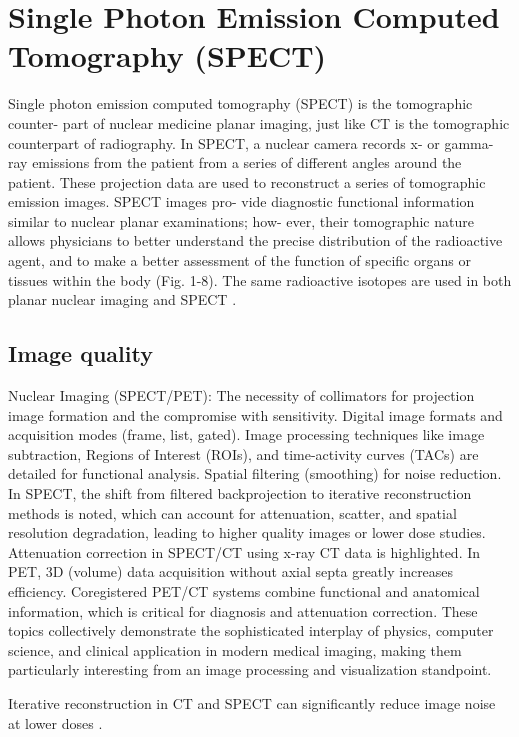 \chapter{Single Photon Emission Computed Tomography (SPECT)}

Single photon emission computed tomography (SPECT) is the tomographic counter-
part of nuclear medicine planar imaging, just like CT is the tomographic counterpart
of radiography. In SPECT, a nuclear camera records x- or gamma-ray emissions from
the patient from a series of different angles around the patient. These projection data
are used to reconstruct a series of tomographic emission images. SPECT images pro-
vide diagnostic functional information similar to nuclear planar examinations; how-
ever, their tomographic nature allows physicians to better understand the precise
distribution of the radioactive agent, and to make a better assessment of the function
of specific organs or tissues within the body (Fig. 1-8). The same radioactive isotopes
are used in both planar nuclear imaging and SPECT \cite{bushberg2011essential}.

\section{Image quality}

Nuclear Imaging (SPECT/PET): The necessity of collimators for
projection image formation and the compromise with
sensitivity. Digital image formats and acquisition modes (frame, list,
gated). Image processing techniques like image subtraction, Regions of
Interest (ROIs), and time-activity curves (TACs) are detailed for
functional analysis. Spatial filtering (smoothing) for noise
reduction. In SPECT, the shift from filtered backprojection to
iterative reconstruction methods is noted, which can account for
attenuation, scatter, and spatial resolution degradation, leading to
higher quality images or lower dose studies. Attenuation correction in
SPECT/CT using x-ray CT data is highlighted. In PET, 3D (volume) data
acquisition without axial septa greatly increases
efficiency. Coregistered PET/CT systems combine functional and
anatomical information, which is critical for diagnosis and
attenuation correction. These topics collectively demonstrate the
sophisticated interplay of physics, computer science, and clinical
application in modern medical imaging, making them particularly
interesting from an image processing and visualization standpoint.

Iterative reconstruction in CT and SPECT can significantly reduce
image noise at lower doses \cite{bushberg2011essential}.
